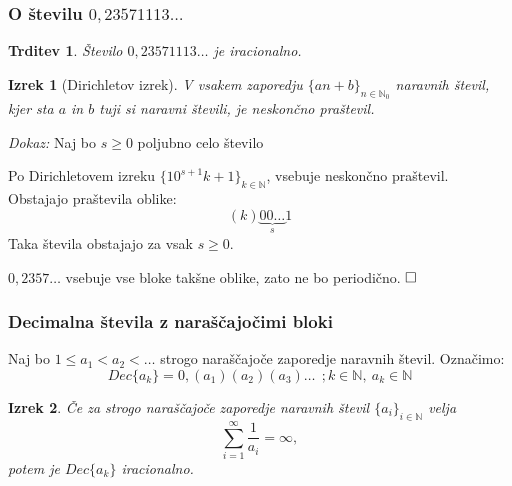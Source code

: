 \documentclass{beamer}
\def\N{\mathbb{N}} %
\def\qed{$\hfill\Box$}   %
\newtheorem{izrek}{Izrek}
\newtheorem{trditev}{Trditev}
\begin{document}
\begin{frame}
    \frametitle{O številu $0,23571113\ldots$}
    \begin{trditev}
        Število $0,23571113 \ldots$ je iracionalno.
    \end{trditev}

    \pause
    \begin{izrek}[Dirichletov izrek]
        \label{Dirichletov izrek}
        V vsakem zaporedju $ \lbrace an + b \rbrace_{n \in \N_0}$ naravnih števil, kjer sta $a$ in $b$
        tuji si naravni števili, je neskončno praštevil.
    \end{izrek}
    \pause
    \emph{Dokaz:} Naj bo $s \geq 0$ poljubno celo število
    
    Po Dirichletovem izreku $ \{10^{s+1}k + 1\}_{k \in \N}$,  vsebuje neskončno praštevil.
    \pause
    Obstajajo praštevila oblike:
    \[(k)\underbrace{00 \ldots}_{s}1\]
    \pause
    Taka števila obstajajo za vsak $s \geq 0$.
    
    $0,2357\ldots$ vsebuje vse bloke takšne oblike, zato ne bo periodično.
    \qed

\end{frame}


\begin{frame}
    \frametitle{Decimalna števila z naraščajočimi bloki}

    Naj bo $1 \leq a_1 < a_2 < \dots $ strogo naraščajoče zaporedje naravnih števil. 
    Označimo: \[Dec\{a_k\} = 0,(a_1)(a_2)(a_3)\ldots \  \ ; k \in \N, \ a_k \in \N \]
    \pause


    \begin{izrek}\label{izrek1clanek1}
        Če za strogo naraščajoče zaporedje naravnih števil $\{a_i\}_{i \in \N}$ velja 
        \[ \sum_{i=1}^{\infty} \frac{1}{a_i} = \infty ,\]
        potem je $Dec\{a_k\}$ iracionalno.
    \end{izrek}

\end{frame}
\end{document}

